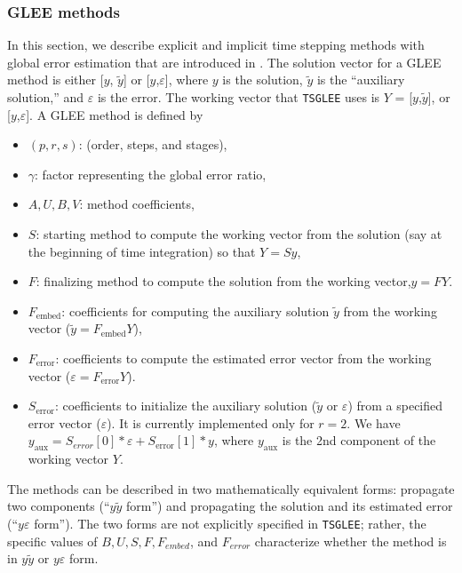 \subsubsection{GLEE methods} In this section, we describe explicit and
implicit time stepping methods with global error estimation that are
introduced in \cite{Constantinescu_TR2016b}.
The solution vector for a GLEE method is either [$y$, $\tilde{y}$] or
[$y$,$\varepsilon$], where $y$ is the solution, $\tilde{y}$ is the
``auxiliary solution,'' and $\varepsilon$ is the error. The working
vector that \lstinline{TSGLEE} uses is $Y$ = [$y$,$\tilde{y}$], or
[$y$,$\varepsilon$]. A GLEE method is defined by
\begin{itemize}
\item $(p,r,s)$: (order, steps, and stages),
\item $\gamma$: factor representing the global error ratio,
\item $A, U, B, V$: method coefficients,
\item $S$: starting method to compute the working vector from the
solution (say at the beginning of time integration) so that $Y = Sy$,
\item $F$: finalizing method to compute the solution from the working
vector,$y = FY$.
\item $F_\text{embed}$: coefficients for computing the auxiliary solution
$\tilde{y}$ from the working vector ($\tilde{y} = F_\text{embed} Y$),
\item $F_\text{error}$: coefficients to compute the estimated error vector
from the working vector ($\varepsilon = F_\text{error} Y$).
\item $S_\text{error}$: coefficients to initialize the auxiliary solution
($\tilde{y}$ or $\varepsilon$) from a specified error vector
($\varepsilon$). It is currently implemented only for $r = 2$. We have $y_\text{aux} =
S_{error}[0]*\varepsilon + S_\text{error}[1]*y$, where $y_\text{aux}$ is the 2nd
component of the working vector $Y$.
\end{itemize}
The methods can be described in two mathematically equivalent forms:
propagate two components (``$y\tilde{y}$ form'') and propagating the
solution and its estimated error (``$y\varepsilon$ form''). The
two forms are not explicitly specified in \lstinline{TSGLEE}; rather, the specific values
of $B, U, S, F, F_{embed}$, and $F_{error}$ characterize whether the method is
in $y\tilde{y}$ or $y\varepsilon$ form.

